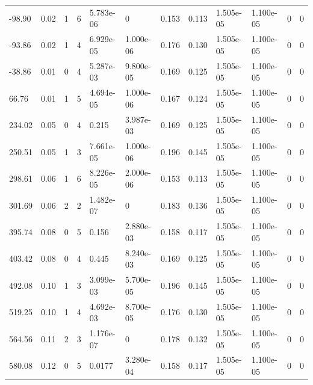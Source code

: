 \documentclass[preview]{standalone}
\begin{document}
{{\begin{tabular}{L{1.2cm}C{1.2cm} C{0.3cm}C{0.5cm} C{1.4cm}C{1.4cm} C{1.4cm}C{1.4cm} C{1.6cm}C{1.6cm} C{1.6cm}C{1.6cm}}
  -98.90  &  0.02  & 1     &  6 &  5.783e-06  & 0  &  0.153&   0.113& 1.505e-05 & 1.100e-05   &  0 & 0  \\ 
  -93.86  &  0.02  & 1     &  4 &  6.929e-05  & 1.000e-06  &  0.176&   0.130& 1.505e-05 & 1.100e-05   &  0 & 0  \\ 
  -38.86  &  0.01  & 0     &  4 &  5.287e-03  & 9.800e-05  &  0.169&   0.125& 1.505e-05 & 1.100e-05   &  0 & 0  \\ 
  66.76  &  0.01  & 1     &  5 &  4.694e-05  & 1.000e-06  &  0.167&   0.124& 1.505e-05 & 1.100e-05   &  0 & 0  \\ 
  234.02  &  0.05  & 0     &  4 &  0.215  & 3.987e-03  &  0.169&   0.125& 1.505e-05 & 1.100e-05   &  0 & 0  \\ 
  250.51  &  0.05  & 1     &  3 &  7.661e-05  & 1.000e-06  &  0.196&   0.145& 1.505e-05 & 1.100e-05   &  0 & 0  \\ 
  298.61  &  0.06  & 1     &  6 &  8.226e-05  & 2.000e-06  &  0.153&   0.113& 1.505e-05 & 1.100e-05   &  0 & 0  \\ 
  301.69  &  0.06  & 2     &  2 &  1.482e-07  & 0  &  0.183&   0.136& 1.505e-05 & 1.100e-05   &  0 & 0  \\ 
  395.74  &  0.08  & 0     &  5 &  0.156  & 2.880e-03  &  0.158&   0.117& 1.505e-05 & 1.100e-05   &  0 & 0  \\ 
  403.42  &  0.08  & 0     &  4 &  0.445  & 8.240e-03  &  0.169&   0.125& 1.505e-05 & 1.100e-05   &  0 & 0  \\ 
  492.08  &  0.10  & 1     &  3 &  3.099e-03  & 5.700e-05  &  0.196&   0.145& 1.505e-05 & 1.100e-05   &  0 & 0  \\ 
  519.25  &  0.10  & 1     &  4 &  4.692e-03  & 8.700e-05  &  0.176&   0.130& 1.505e-05 & 1.100e-05   &  0 & 0  \\ 
  564.56  &  0.11  & 2     &  3 &  1.176e-07  & 0  &  0.178&   0.132& 1.505e-05 & 1.100e-05   &  0 & 0  \\ 
  580.08  &  0.12  & 0     &  5 &  0.0177  & 3.280e-04  &  0.158&   0.117& 1.505e-05 & 1.100e-05   &  0 & 0  \\ 
\hline 
\end{tabular} 

}}
\end{document}
